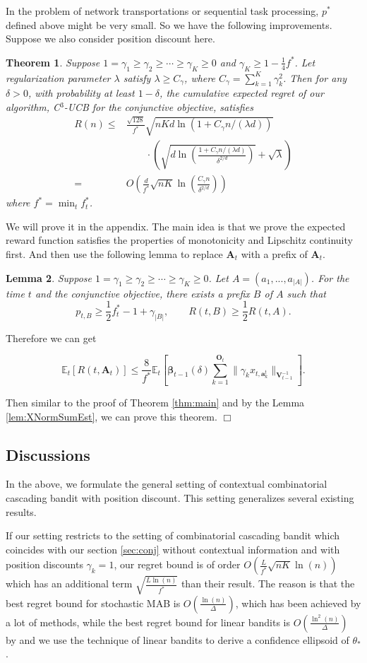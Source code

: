 \documentclass{article}
\newcommand{\bbeta}{\boldsymbol{\beta}}
\newcommand{\EE}{\mathbb{E}}
\newcommand{\bA}{\mathbf{A}}
\newcommand{\ba}{\mathbf{a}}
\newcommand{\bO}{\mathbf{O}}
\newcommand{\bV}{\mathbf{V}}
\newcommand{\abs}[1]{\left| #1 \right|}
\newcommand{\norm}[1]{\| #1 \|}
\newtheorem{theorem}{Theorem}[section]
\newtheorem{lemma}[theorem]{Lemma}%
\newenvironment{proof}{\noindent {\textbf{Proof. }}}{$\Box$ \medskip}
\newcommand{\CLemmaPrefixExi}{
	Suppose $1 = \gamma_1 \geq \gamma_2 \geq \cdots \geq \gamma_K \geq 0$. Let $A = (a_1, ..., a_{\abs{A}})$. For the time $t$ and the conjunctive objective, there exists a prefix $B$ of $A$ such that 
	$$
	p_{t, B} \geq \frac{1}{2}f_{t}^{\ast} - 1 + \gamma_{\abs{B}}, \qquad R(t, B) \geq \frac{1}{2} R(t, A).
	$$ 
}
\newcommand{\CEqDeltaEstAnd}{
	$$
	\EE_t [R(t, \bA_t) ] \leq \frac{8}{f^{\ast}} \EE_t \left[ \bbeta_{t-1}(\delta)\sum_{k=1}^{\bO_t}\norm{\gamma_k x_{t,\ba_k^t}}_{\bV_{t-1}^{-1}} \right].
	$$
}
\begin{document}
In the problem of network transportations or sequential task processing, $p^*$ defined above might be very small. So we have the following improvements. Suppose we also consider position discount here.  
\begin{theorem} %
	\label{thm:and}
	Suppose $1 = \gamma_1 \geq \gamma_2 \geq \cdots \geq \gamma_{K} \geq 0$ and $\gamma_K \geq 1 - \frac{1}{4} f^{\ast}$. Let regularization parameter $\lambda$ satisfy $\lambda \geq C_\gamma$, where $C_\gamma = \sum_{k=1}^{K} \gamma_k^2$. Then for any $\delta > 0$, with probability at least $1 - \delta$, the cumulative expected regret of our algorithm, C$^3$-UCB for the conjunctive objective, satisfies
	\begin{align}
		R(n) \le& \frac{\sqrt{128}}{f^{\ast}} \sqrt{nKd\ln(1 + C_\gamma n/(\lambda d))} \nonumber \\
		&\qquad \cdot \left(\sqrt{d\ln \left( \frac{1 + C_\gamma n/(\lambda d)}{\delta^{2/d}}\right) } + \sqrt{\lambda}\right) \nonumber \\
		=&O\left(\frac{d}{f^{\ast}}\sqrt{nK} \ln \left(\frac{C_\gamma n}{\delta^{2/d}}\right) \right)
	\end{align}
	where $f^* = \min_{t} f_t^{\ast}$.
\end{theorem}
\begin{proof}
	We will prove it in the appendix. The main idea is that we prove the expected reward function satisfies the properties of monotonicity and Lipschitz continuity first. And then use the following lemma to replace $\bA_t$ with a prefix of $\bA_t$.
	\begin{lemma}
		\CLemmaPrefixExi
	\end{lemma}
	
	Therefore we can get
	\CEqDeltaEstAnd
	
	Then similar to the proof of Theorem \ref{thm:main} and by the Lemma \ref{lem:XNormSumEst}, we can prove this theorem.
\end{proof}


\subsection{Discussions}

In the above, we formulate the general setting of contextual combinatorial cascading bandit with position discount. This setting generalizes several existing results. 

If our setting restricts to the setting of combinatorial cascading bandit \cite{kveton2015combinatorial} which coincides with our section \ref{sec:conj} without contextual information and with position discounts $\gamma_k = 1$, our regret bound is of order $O\left(\frac{L}{f^*}\sqrt{nK}\ln(n)\right)$ which has an additional term $\sqrt{\frac{L\ln(n)}{f^*}}$ than their result. The reason is that the best regret bound for stochastic MAB is $O(\frac{\ln(n)}{\Delta})$, which has been achieved by a lot of methods, while the best regret bound for linear bandits is $O\left(\frac{\ln^2(n)}{\Delta}\right)$ by \cite{abbasi2011improved} and we use the technique of linear bandits to derive a confidence ellipsoid of $\theta_{\ast}$.  
\end{document}
